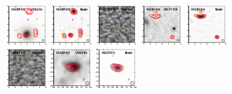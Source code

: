 \documentclass[iop]{emulateapj}
\begin{document}
\begin{figure}[!tbp] 
    \begin{centering}
\includegraphics[width=0.162\textwidth]{../Figures/modelfit/HECDFS12_optical_bestfit.pdf}
\includegraphics[width=0.162\textwidth]{../Figures/modelfit/HECDFS12_model_bestfit.pdf}
\includegraphics[width=0.162\textwidth]{../Figures/modelfit/HECDFS12_residual_bestfit.pdf}
\includegraphics[width=0.162\textwidth]{../Figures/modelfit/HECDFS04_optical_bestfit.pdf}
\includegraphics[width=0.162\textwidth]{../Figures/modelfit/HECDFS04_model_bestfit.pdf}
\includegraphics[width=0.162\textwidth]{../Figures/modelfit/HECDFS04_residual_bestfit.pdf}
\includegraphics[width=0.162\textwidth]{../Figures/modelfit/HECDFS13_optical_bestfit.pdf}
\includegraphics[width=0.162\textwidth]{../Figures/modelfit/HECDFS13_model_bestfit.pdf}

\end{centering}
\end{figure}
\end{document}
